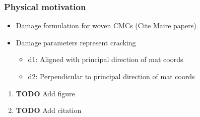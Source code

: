 \documentclass[11pt]{article}
\begin{document}
\subsubsection{Physical motivation}
\label{sec:orgd3feb51}
\begin{itemize}
\item Damage formulation for woven CMCs (Cite Maire papers)
\item Damage parameters represent cracking
\begin{itemize}
\item d1: Aligned with principal direction of mat coords
\item d2: Perpendicular to principal direction of mat coords
\end{itemize}
\end{itemize}
\begin{enumerate}
\item {\bfseries\sffamily TODO} Add figure
\label{sec:org527de92}
\item {\bfseries\sffamily TODO} Add citation
\label{sec:org10ac20b}
\end{enumerate}
\end{document}
